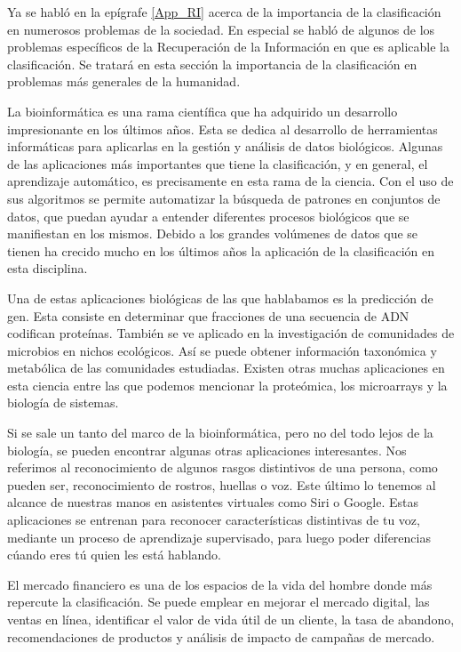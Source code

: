 \documentclass{llncs}
\begin{document}
Ya se habl\'o en la ep\'igrafe \ref{App_RI} acerca de la importancia de la clasificaci\'on en numerosos problemas de la sociedad. En especial se habl\'o de algunos de los problemas espec\'ificos de la Recuperaci\'on de la Informaci\'on en que es aplicable la clasificaci\'on. Se tratar\'a en esta secci\'on la importancia de la clasificaci\'on en problemas m\'as generales de la humanidad.

La bioinform\'atica es una rama cient\'ifica que ha adquirido un desarrollo impresionante en los \'ultimos a\~nos. Esta se dedica al desarrollo de herramientas inform\'aticas para aplicarlas en la gesti\'on y an\'alisis de datos biol\'ogicos. Algunas  de las aplicaciones m\'as importantes que tiene la clasificaci\'on, y en general, el aprendizaje autom\'atico, es precisamente en esta rama de la ciencia. Con el uso de sus algoritmos se permite automatizar la b\'usqueda de patrones en conjuntos de datos, que puedan ayudar a entender diferentes procesos biol\'ogicos que se manifiestan en los mismos. Debido a los grandes vol\'umenes de datos que se tienen ha crecido mucho en los \'ultimos a\~nos la aplicaci\'on de la clasificaci\'on en esta disciplina.

Una de estas aplicaciones biol\'ogicas de las que hablabamos es la predicci\'on de gen. Esta consiste en determinar que fracciones de una secuencia de ADN codifican prote\'inas. Tambi\'en se ve aplicado en la investigaci\'on de comunidades de microbios en nichos ecol\'ogicos. As\'i se puede obtener informaci\'on taxon\'omica y metab\'olica de las comunidades estudiadas. Existen otras muchas aplicaciones en esta ciencia entre las que podemos mencionar la prote\'omica, los microarrays y la biolog\'ia de sistemas.

Si se sale un tanto del marco de la bioinform\'atica, pero no del todo lejos de la biolog\'ia, se pueden encontrar algunas otras aplicaciones interesantes. Nos referimos al reconocimiento de algunos rasgos distintivos de una persona, como pueden ser, reconocimiento de rostros, huellas o voz. Este \'ultimo lo tenemos al alcance de nuestras manos en asistentes virtuales como Siri o  Google. Estas aplicaciones se entrenan para reconocer caracter\'isticas distintivas de tu voz, mediante un proceso de aprendizaje supervisado, para luego poder diferencias c\'uando eres t\'u quien les est\'a hablando.

El mercado financiero es una de los espacios de la vida del hombre donde m\'as repercute la clasificaci\'on. Se puede emplear en mejorar el mercado digital, las ventas en l\'inea, identificar el valor de vida \'util de un cliente, la tasa de abandono, recomendaciones de productos y an\'alisis de impacto de campa\~nas de mercado.
\end{document}
